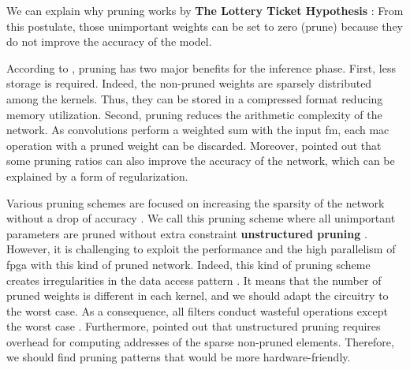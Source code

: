We can explain why pruning works by \textbf{The Lottery Ticket Hypothesis} \cite{frankle_lottery_2018, frankle_early_2020}:  From this postulate, those unimportant weights can be set to zero (prune) because they do not improve the accuracy of the model.

According to \textcite{cheng_recent_2018}, pruning has two major benefits for the inference phase. First, less storage is required. Indeed, the non-pruned weights are sparsely distributed among the kernels. Thus, they can be stored in a compressed format reducing memory utilization. Second, pruning reduces the arithmetic complexity of the network. As convolutions perform a weighted sum with the input \acrshort{fm}, each \acrfull{mac} operation with a pruned weight can be discarded. Moreover, \textcite{han_learning_2015, mao_exploring_2017, kang_accelerator-aware_2020} pointed out that some pruning ratios can also improve the accuracy of the network, which can be explained by a form of regularization.

Various pruning schemes are focused on increasing the sparsity of the network without a drop of accuracy \cite{han_deep_2016, han_learning_2015}.  We call this pruning scheme where all unimportant parameters are pruned without extra constraint \textbf{unstructured pruning} \cite{cheng_recent_2018}. However, it is challenging to exploit the performance and the high parallelism of \acrshort{fpga} with this kind of pruned network. Indeed, this kind of pruning scheme creates irregularities in the data access pattern \cite{zhu_efficient_2020}. It means that the number of pruned weights is different in each kernel, and we should adapt the circuitry to the worst case. As a consequence, all filters conduct wasteful operations except the worst case \cite{shimoda_filter-wise_2019}. Furthermore, \textcite{anwar_structured_2017} pointed out that unstructured pruning requires overhead for computing addresses of the sparse non-pruned elements. Therefore, we should find pruning patterns that would be more hardware-friendly.

